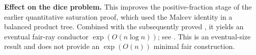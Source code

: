\documentclass[11pt]{article}
\begin{document}
\noindent\textbf{Effect on the dice problem.} This improves the
positive-fraction stage of the earlier quantitative saturation proof,
which used the Malcev identity in a balanced product tree.
Combined with the subsequently proved
, it yields an eventual
fair-ray conductor $\exp(O(n\log n))$; see
. This is an eventual-size
result and does not provide an $\exp(O(n))$ minimal fair construction.
\end{document}
